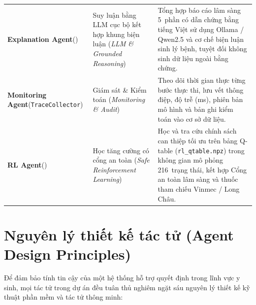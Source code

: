 \begin{table}[htbp]
\begin{tabularx}{\linewidth}{@{}L{3.7cm}L{3.2cm}Y@{}}
\addlinespace[3pt]
\textbf{Explanation Agent}\newline () &
Suy luận bằng LLM cục bộ kết hợp khung biện luận (\emph{LLM \& Grounded Reasoning}) &
Tổng hợp báo cáo lâm sàng 5~phần có dẫn chứng bằng tiếng Việt sử dụng Ollama / Qwen2.5 và cơ chế biện luận sinh lý bệnh, tuyệt đối không sinh dữ liệu ngoài bằng chứng. \\
\addlinespace[3pt]
\textbf{Monitoring Agent}\newline (\texttt{TraceCollector}) &
Giám sát \& Kiểm toán (\emph{Monitoring \& Audit}) &
Theo dõi thời gian thực từng bước thực thi, lưu vết thông điệp, độ trễ (ms), phiên bản mô hình và bản ghi kiểm toán vào cơ sở dữ liệu. \\
\addlinespace[3pt]
\textbf{RL Agent}\newline () &
Học tăng cường có cổng an toàn (\emph{Safe Reinforcement Learning}) &
Học và tra cứu chính sách can thiệp tối ưu trên bảng Q-table (\texttt{rl\_qtable.npz}) trong không gian mô phỏng 216~trạng thái, kết hợp Cổng an toàn lâm sàng và thuốc tham chiếu Vinmec / Long Châu. \\
\bottomrule
\end{tabularx}
\end{table}

\section{Nguyên lý thiết kế tác tử (Agent Design Principles)}
\label{sec:agent-design-principles}

Để đảm bảo tính tin cậy của một hệ thống hỗ trợ quyết định trong lĩnh vực y sinh, mọi tác tử trong dự án đều tuân thủ nghiêm ngặt sáu nguyên lý thiết kế kỹ thuật phần mềm và tác tử thông minh:


